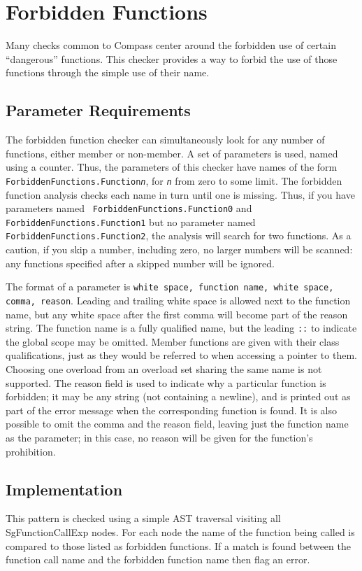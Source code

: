 
\section{Forbidden Functions}
\label{ForbiddenFunctions::overview}
Many checks common to Compass center around the forbidden use of certain ``dangerous'' functions. This checker provides a way to forbid the use of those functions through the simple use of their name.

\subsection{Parameter Requirements}
The forbidden function checker can simultaneously look for any number of
functions, either member or non-member.  A set of parameters is used, named
using a counter.  Thus, the parameters of this checker have names of the
form {\tt ForbiddenFunctions.Function{\it n}}, for {\tt {\it n}} from zero
to some limit.  The forbidden function analysis checks each name in turn
until one is missing.  Thus, if you have parameters named {\tt
ForbiddenFunctions.Function0} and {\tt ForbiddenFunctions.Function1} but no
parameter named {\tt ForbiddenFunctions.Function2}, the analysis will
search for two functions.  As a caution, if you skip a number, including
zero, no larger numbers will be scanned: any functions specified after a
skipped number will be ignored.

The format of a parameter is {\tt white space, function name, white space,
comma, reason}.  Leading and trailing white space is allowed next to the
function name, but any white space after the first comma will become part
of the reason string.  The function name is a fully qualified name, but the
leading {\tt ::} to indicate the global scope may be omitted.  Member
functions are given with their class qualifications, just as they would be
referred to when accessing a pointer to them.  Choosing one overload from
an overload set sharing the same name is not supported.  The reason field
is used to indicate why a particular function is forbidden; it may be any
string (not containing a newline), and is printed out as part of the error
message when the corresponding function is found.  It is also possible to
omit the comma and the reason field, leaving just the function name as the
parameter; in this case, no reason will be given for the function's
prohibition.

\subsection{Implementation}
This pattern is checked using a simple AST traversal visiting all SgFunctionCallExp nodes. For each node the name of the function being called is compared to those listed as forbidden functions. If a match is found between the function call name and the forbidden function name then flag an error.

